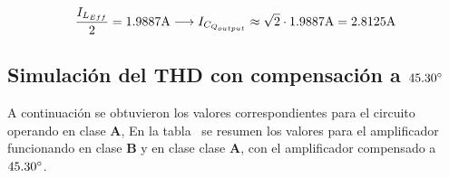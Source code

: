 \begin{equation*}
\frac{I_{L_{Eff}}}{2} = 1.9887 \si[per-mode=symbol]{\ampere} \longrightarrow I_{C_{Q_{output}}} \approx \sqrt{2} \cdot 1.9887 \si[per-mode=symbol]{\ampere} = 2.8125 \si[per-mode=symbol]{\ampere}
\end{equation*}


\subsection{Simulación del \textbf{THD} con compensación a $45.30 \si[per-mode=symbol]{\degree}$ }

A continuación se obtuvieron los valores correspondientes para el circuito operando en clase \textbf{A}, 
En la tabla~ se resumen los valores para el amplificador funcionando en clase \textbf{B} y en clase clase \textbf{A}, con el amplificador compensado a $45.30 \si[per-mode=symbol]{\degree}$.


 
\begin{table}[H]  %

    \setlength\arrayrulewidth{1.5pt}
    \def\clinecolor{\hhline{|>{\arrayrulecolor{white}}-%
    >{\arrayrulecolor{white}}|-|-|-|}}
	\caption{\footnotesize{THD obtenido a $1 \si[per-mode=symbol]{\kilo\hertz}$ y $10 \si[per-mode=symbol]{\kilo\hertz}$ para modo de operación en clase \textbf{B} y clase \textbf{A}, compensado a $45.30 \si[per-mode=symbol]{\degree}$.}}
	\label{table:table_THD_vs_freq_and_compensation}
\end{table}

